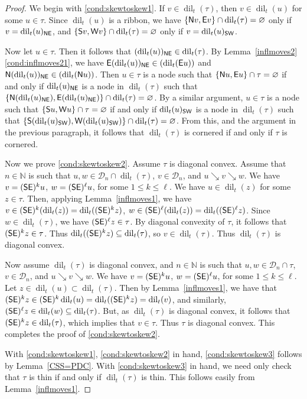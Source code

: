 \documentclass[Unicode,ALCO]{cedram}
\newcommand{\infl}{\operatorname{dil}}
\newcommand{\0}{{\bar 0}}
\newcommand{\NN}{{\mathbb N}}
\newcommand{\D}{{\mathcal D}}
\newcommand{\so}{{\sf S}}
\newcommand{\no}{{\sf N}}
\newcommand{\ea}{{\sf E}}
\newcommand{\we}{{\sf W}}
\newcommand{\nnee}{{\sf NE}}
\newcommand{\ssee}{{\sf SE}}
\newcommand{\ssww}{{\sf SW}}
\begin{document}
\begin{proof}
We begin with \eqref{cond:skewtoskew1}.
If \(v \in \infl_t(\tau)\), then \(v \in \infl_t(u)\) for some \(u \in \tau\). Since \(\infl_t(u)\) is a ribbon, we have \(\{\no v, \ea v\} \cap \infl_t(\tau) = \varnothing\) only if \(v = \infl_t(u)_\nnee\), and \(\{\so v, \we v\} \cap \infl_t(\tau) = \varnothing\) only if \(v = \infl_t(u)_\ssww\). 

Now let \(u \in \tau\). 
Then it follows that \((\infl_t(u))_\nnee \in \infl_t(\tau)\). By Lemma~\ref{inflmoves2}\eqref{cond:inflmoves21}, we have \(\ea(\infl_t(u))_\nnee \in (\infl_t(\ea u))\) and \(\no(\infl_t(u))_\nnee \in (\infl_t(\no u))\). Then \(u \in \tau\) is a node such that \(\{\no u,  \ea u\} \cap \tau = \varnothing\) if and only if \(\infl_t(u)_\nnee\) is a node in \(\infl_t(\tau)\) such that \(\{\no(\infl_t(u)_\nnee), \ea(\infl_t(u)_\nnee)\} \cap \infl_t(\tau) = \varnothing\). By a similar argument, \(u \in \tau\) is a node such that \(\{\so u,  \we u\} \cap \tau = \varnothing\) if and only if \(\infl_t(u)_\ssww\) is a node in \(\infl_t(\tau)\) such that \(\{\so(\infl_t(u)_\ssww), \we(\infl_t(u)_\ssww)\} \cap \infl_t(\tau) = \varnothing\). From this, and the argument in the previous paragraph, it follows that \(\infl_t(\tau)\) is cornered if and only if \(\tau\) is cornered.

Now we prove \eqref{cond:skewtoskew2}.
Assume \(\tau\) is diagonal convex. Assume that \(n \in \NN\) is such that \(u,w \in \D_n \cap \infl_t(\tau)\), \(v \in \D_n\), and \(u \searrow v \searrow w\). We have \(v = (\ssee)^ku\), \(w = (\ssee)^\ell u\), for some \(1 \leq k \leq \ell\).
We have \(u \in \infl_t(z)\) for some \(z \in \tau\). Then, applying Lemma~\ref{inflmoves1}, we have \(v \in (\ssee)^k(\infl_t(z)) = \infl_t((\ssee)^kz)\), \(w \in (\ssee)^\ell(\infl_t(z)) = \infl_t((\ssee)^\ell z)\). Since \(w \in \infl_t(\tau)\), we have \((\ssee)^\ell z \in \tau\). By diagonal convexity of \(\tau\), it follows that \((\ssee)^k z \in \tau\). Thus \(\infl_t((\ssee)^kz) \subseteq \infl_t(\tau)\), so \(v \in \infl_t(\tau)\). Thus \(\infl_t(\tau)\) is diagonal convex.

Now assume \(\infl_t(\tau)\) is diagonal convex, and \(n \in \NN\) is such that \(u,w \in \D_n \cap \tau\), \(v \in \D_n\), and \(u \searrow v \searrow w\). We have \(v = (\ssee)^ku\), \(w = (\ssee)^\ell u\), for some \(1 \leq k \leq \ell\). Let \(z \in \infl_t(u) \subset \infl_t(\tau)\). 
 Then by Lemma~\ref{inflmoves1}, we have that \((\ssee)^k z \in (\ssee)^k \infl_t(u) = \infl_t((\ssee)^k z) = \infl_t(v)\), and similarly, \((\ssee)^\ell z \in \infl_t(w) \subseteq \infl_t(\tau)\). But, as \(\infl_t(\tau)\) is diagonal convex, it follows that \((\ssee)^kz \in \infl_t(\tau)\), which implies that \(v \in \tau\). Thus \(\tau\) is diagonal convex. This completes the proof of \eqref{cond:skewtoskew2}.
 
 With \eqref{cond:skewtoskew1}, \eqref{cond:skewtoskew2} in hand, \eqref{cond:skewtoskew3} follows by Lemma~\ref{CSS=PDC}. With \eqref{cond:skewtoskew3} in hand, we need only check that \(\tau\) is thin if and only if \(\infl_t(\tau)\) is thin. This follows easily from Lemma~\ref{inflmoves1}.
\end{proof}
\end{document}
